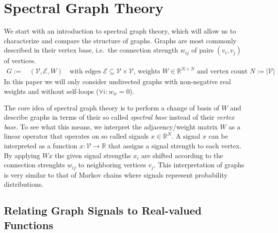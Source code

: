\section{Spectral Graph Theory}%
\label{sec:sgt}

We start with an introduction to spectral graph theory, which will allow us to characterize and compare the structure of graphs.
Graphs are most commonly described in their vertex base, i.e.\  the connection strength $w_{i j}$ of pairs $(v_i, v_j)$ of vertices.
\begin{align}
	G :=&\, (\mathcal{V}, \mathcal{E}, W)\quad\text{with edges } \mathcal{E} \subseteq \mathcal{V} \times \mathcal{V}\text{, weights } W \in \mathbb{R}^{N \times N}\text{ and vertex count } N := |\mathcal{V}|
\end{align}
In this paper we will only consider undirected graphs with non-negative real weights and without self-loops ($\forall i: w_{i i} = 0$).

The core idea of spectral graph theory is to perform a change of basis of $W$ and describe graphs in terms of their so called \textit{spectral base} instead of their \textit{vertex base}.
To see what this means, we interpret the adjacency/weight matrix $W$ as a linear operator that operates on so called signals $x \in \mathbb{R}^N$.
A signal $x$ can be interpreted as a function $x: \mathcal{V} \to \mathbb{R}$ that assigns a signal strength to each vertex.
By applying $Wx$ the given signal strengths $x_i$ are shifted according to the connection strenghts $w_{i j}$ to neighboring vertices $v_j$.
This interpretation of graphs is very similar to that of Markov chains where signals represent probability distributions.

\subsection{Relating Graph Signals to Real-valued Functions}%
\label{sec:sgt:real}

